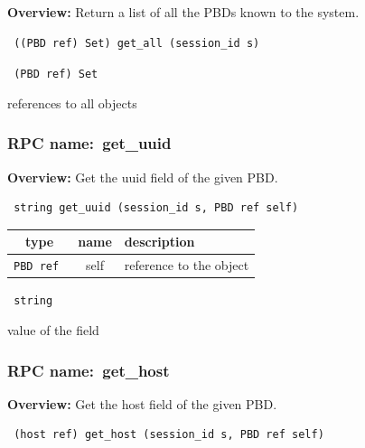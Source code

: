 {\bf Overview:} 
Return a list of all the PBDs known to the system.

\begin{verbatim} ((PBD ref) Set) get_all (session_id s)\end{verbatim}


\vspace{0.3cm}

{\tt 
(PBD ref) Set
}


references to all objects
\vspace{0.3cm}
\vspace{0.3cm}
\vspace{0.3cm}
\subsubsection{RPC name:~get\_uuid}

{\bf Overview:} 
Get the uuid field of the given PBD.

\begin{verbatim} string get_uuid (session_id s, PBD ref self)\end{verbatim}



 
\vspace{0.3cm}
\begin{tabular}{|c|c|p{7cm}|}
 \hline
{\bf type} & {\bf name} & {\bf description} \\ \hline
{\tt PBD ref } & self & reference to the object \\ \hline 

\end{tabular}

\vspace{0.3cm}

{\tt 
string
}


value of the field
\vspace{0.3cm}
\vspace{0.3cm}
\vspace{0.3cm}
\subsubsection{RPC name:~get\_host}

{\bf Overview:} 
Get the host field of the given PBD.

\begin{verbatim} (host ref) get_host (session_id s, PBD ref self)\end{verbatim}


